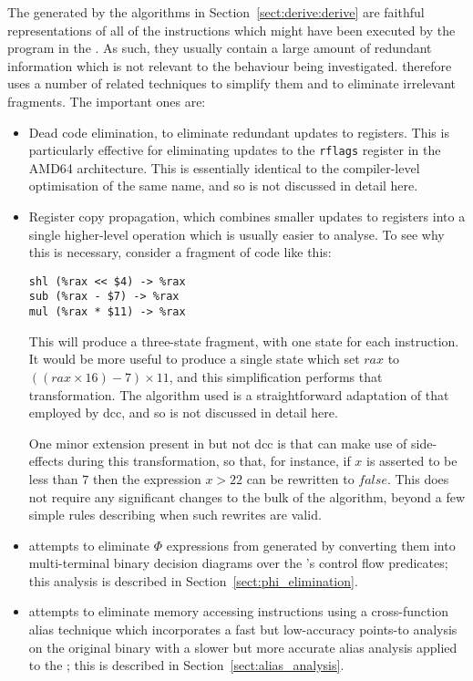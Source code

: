 
The {\StateMachines} generated by the algorithms in
Section~\ref{sect:derive:derive} are faithful representations of all
of the instructions which might have been executed by the program in
the .  As such, they usually contain a large
amount of redundant information which is not relevant to the behaviour
being investigated.  {\Technique} therefore uses a number of related
techniques to simplify them and to eliminate irrelevant fragments.
The important ones are:

\begin{itemize}
\item
  Dead code elimination, to eliminate redundant updates to registers.
  This is particularly effective for eliminating updates to the
  \verb|rflags| register in the AMD64 architecture. This is
  essentially identical to the compiler-level optimisation of the same
  name\needCite{}, and so is not discussed in detail here.
\item
  Register copy propagation, which combines smaller updates to
  registers into a single higher-level operation which is usually
  easier to analyse.  To see why this is necessary, consider
  a fragment of code like this:

\begin{verbatim}
shl (%rax << $4) -> %rax
sub (%rax - $7) -> %rax
mul (%rax * $11) -> %rax
\end{verbatim}
  
  This will produce a three-state {\StateMachine} fragment, with one
  state for each instruction.  It would be more useful to produce a
  single state which set $rax$ to $((rax \times 16) - 7) \times 11$,
  and this simplification performs that transformation.  The algorithm
  used is a straightforward adaptation of that employed by
  dcc\needCite{}, and so is not discussed in detail here.

  One minor extension present in {\implementation} but not dcc is that
  {\implementation} can make use of  side-effects during
  this transformation, so that, for instance, if $x$ is asserted to be
  less than $7$ then the expression $x > 22$ can be rewritten to
  $\mathit{false}$.  This does not require any significant changes to
  the bulk of the algorithm, beyond a few simple rules describing when
  such rewrites are valid.
\item
  {\Technique} attempts to eliminate $\Phi$ expressions from generated
  {\StateMachines} by converting them into multi-terminal binary
  decision diagrams over the {\StateMachine}'s control flow predicates;
  this analysis is described in Section~\ref{sect:phi_elimination}.
\item
  {\Technique} attempts to eliminate memory accessing instructions
  using a cross-function alias technique which incorporates a fast but
  low-accuracy points-to analysis on the original binary with a slower
  but more accurate alias analysis applied to the {\StateMachine};
  this is described in Section~\ref{sect:alias_analysis}.
\end{itemize}

